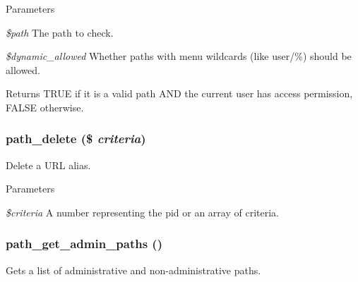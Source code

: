\begin{DoxyParams}{Parameters}
\item[{\em \$path}]The path to check. \item[{\em \$dynamic\_\-allowed}]Whether paths with menu wildcards (like user/\%) should be allowed.\end{DoxyParams}
\begin{DoxyReturn}{Returns}
TRUE if it is a valid path AND the current user has access permission, FALSE otherwise. 
\end{DoxyReturn}
\hypertarget{path_8inc_adbe589627a12c7be338700a1df1bc357}{
\subsubsection[{path\_\-delete}]{\setlength{\rightskip}{0pt plus 5cm}path\_\-delete (\$ {\em criteria})}}
\label{path_8inc_adbe589627a12c7be338700a1df1bc357}
Delete a URL alias.


\begin{DoxyParams}{Parameters}
\item[{\em \$criteria}]A number representing the pid or an array of criteria. \end{DoxyParams}
\hypertarget{path_8inc_acc77f0daab31d02be34e83a61ad3991c}{
\subsubsection[{path\_\-get\_\-admin\_\-paths}]{\setlength{\rightskip}{0pt plus 5cm}path\_\-get\_\-admin\_\-paths ()}}
\label{path_8inc_acc77f0daab31d02be34e83a61ad3991c}
Gets a list of administrative and non-\/administrative paths.


